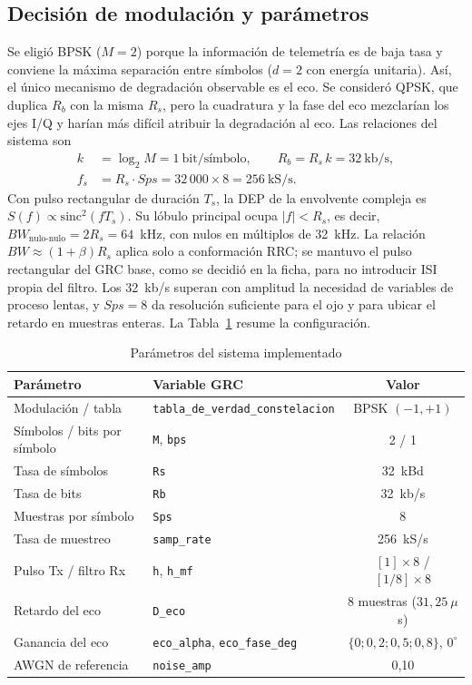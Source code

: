 \subsection{Decisión de modulación y parámetros}
Se eligió BPSK ($M=2$) porque la información de telemetría es de baja tasa y conviene la máxima separación entre símbolos ($d=2$ con energía unitaria). Así, el único mecanismo de degradación observable es el eco. Se consideró QPSK, que duplica $R_b$ con la misma $R_s$, pero la cuadratura y la fase del eco mezclarían los ejes I/Q y harían más difícil atribuir la degradación al eco. Las relaciones del sistema \cite{guia1,guia2} son
\begin{align}
    k&=\log_2 M = 1~\text{bit/símbolo}, \qquad R_b=R_s\,k=32~\text{kb/s},\label{eq:rb}\\
    f_s&=R_s\cdot Sps=32\,000\times 8=256~\text{kS/s}.\label{eq:fs}
\end{align}
Con pulso rectangular de duración $T_s$, la DEP de la envolvente compleja es $S(f)\propto\mathrm{sinc}^2(fT_s)$. Su lóbulo principal ocupa $|f|<R_s$, es decir, $BW_{\text{nulo-nulo}}=2R_s=64$~kHz, con nulos en múltiplos de 32~kHz. La relación $BW\approx(1+\beta)R_s$ aplica solo a conformación RRC; se mantuvo el pulso rectangular del GRC base, como se decidió en la ficha, para no introducir ISI propia del filtro. Los 32~kb/s superan con amplitud la necesidad de variables de proceso lentas, y $Sps=8$ da resolución suficiente para el ojo y para ubicar el retardo en muestras enteras. La Tabla~\ref{tab:parametros} resume la configuración.

\begin{table}[!t]
\centering
\caption{Parámetros del sistema implementado}
\label{tab:parametros}
\footnotesize
\begin{tabular}{llc}
\toprule
\textbf{Parámetro} & \textbf{Variable GRC} & \textbf{Valor} \\
\midrule
Modulación / tabla & \texttt{tabla\_de\_verdad\_constelacion} & BPSK $(-1, +1)$ \\
Símbolos / bits por símbolo & \texttt{M}, \texttt{bps} & 2 / 1 \\
Tasa de símbolos & \texttt{Rs} & 32~kBd \\
Tasa de bits & \texttt{Rb} & 32~kb/s \\
Muestras por símbolo & \texttt{Sps} & 8 \\
Tasa de muestreo & \texttt{samp\_rate} & 256~kS/s \\
Pulso Tx / filtro Rx & \texttt{h}, \texttt{h\_mf} & $[1]\times8$ / $[1/8]\times8$ \\
Retardo del eco & \texttt{D\_eco} & 8 muestras ($31{,}25~\mu$s) \\
Ganancia del eco & \texttt{eco\_alpha}, \texttt{eco\_fase\_deg} & $\{0;0{,}2;0{,}5;0{,}8\}$, $0^\circ$ \\
AWGN de referencia & \texttt{noise\_amp} & 0,10 \\
\bottomrule
\end{tabular}
\end{table}

